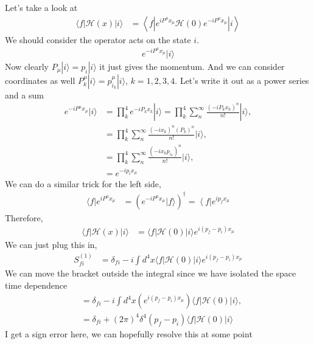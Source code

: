 \documentclass[working, oneside]{../../Preambles/tuftebook}
\begin{document}
\begin{solution}
Let's take a look at
\begin{align*}
\langle f | \mathcal{H}(x) | i \rangle
&= \left\langle f \left| e^{i P^\mu x_\mu} \mathcal{H}(0) e^{-i P^\mu x_\mu} \right| i \right\rangle
\end{align*}
We should consider the operator acts on the state \( i \).
\begin{align*}
e^{-i P^\mu x_\mu} | i \rangle
\end{align*}
Now clearly \( P_\mu | i \rangle = p_i | i \rangle \) it just gives the momentum. And we can consider coordinates as well \( P_k^\mu | i \rangle = p_{i_k}^\mu | i \rangle \), \( k = 1, 2, 3, 4 \).
\noindent
Let's write it out as a power series and a sum
\begin{align*}
e^{-i P^\mu x_\mu} | i \rangle
&= \prod_k^4 e^{-i P_k x_k} | i \rangle = \prod_k^4 \sum_n^\infty \frac{(-i P_k x_k)^n}{n!} | i \rangle, \\
&= \prod_k^4 \sum_n^\infty \frac{(-i x_k)^n (P_k)^n}{n!} | i \rangle, \\
&= \prod_k^4 \sum_n^\infty \frac{(-i x_k p_{i_k})^n}{n!} | i \rangle, \\
&= e^{-i p_i x_\mu}
\end{align*}
We can do a similar trick for the left side,
\begin{align*}
\langle f | e^{i P^\mu x_\mu}
&= \left( e^{-i P^\mu x_\mu} | f \rangle \right)^\dagger = \left<f \right|e^{i p_f x_\mu}
\end{align*}
Therefore,
\begin{align*}
\langle f | \mathcal{H}(x) | i \rangle
&= \langle f | \mathcal{H}(0) | i \rangle e^{i (p_f - p_i) x_\mu}
\end{align*}
We can just plug this in,
\begin{align*}
S_{fi}^{(1)}
&= \delta_{fi} - i \int d^4x \langle f | \mathcal{H}(0) | i \rangle e^{i (p_f - p_i) x_\mu}
\end{align*}
We can move the bracket outside the integral since we have isolated the space time dependence
\begin{align*}
&= \delta_{fi} - i \int d^4x \left( e^{i (p_f - p_i) x_\mu} \right) \langle f | \mathcal{H}(0) | i \rangle, \\
&= \delta_{fi} + (2\pi)^4 \delta^4(p_f - p_i) \langle f | \mathcal{H}(0) | i \rangle
\end{align*}
I get a sign error here, we can hopefully resolve this at some point 
\end{solution}
\end{document}
